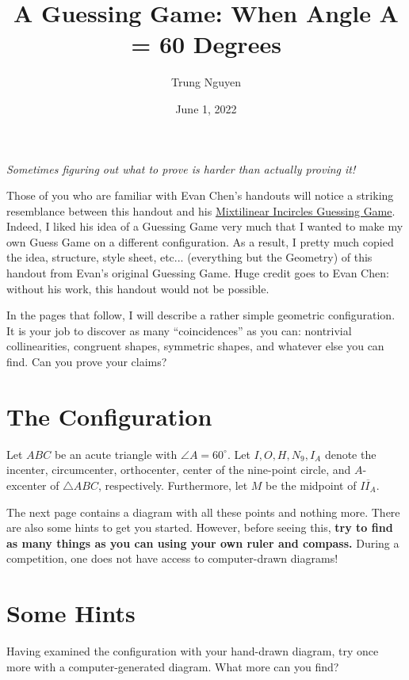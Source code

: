 \documentclass[11pt]{scrartcl}
\begin{document}
\title{A Guessing Game: When Angle A = 60 Degrees}
\author{Trung Nguyen}
\date{June 1, 2022}
\maketitle


\begin{center}
	\itshape
	Sometimes figuring out what to prove is harder than actually proving it!
\end{center}

Those of you who are familiar with Evan Chen's handouts will notice a striking resemblance between this handout and his \href{https://web.evanchen.cc/handouts/Mixt-GeoGuessr/Mixt-GeoGuessr.pdf}{Mixtilinear Incircles Guessing Game}. Indeed, I liked his idea of a Guessing Game very much that I wanted to make my own Guess Game on a different configuration. As a result, I pretty much copied the idea, structure, style sheet, etc...  (everything but the Geometry) of this handout from Evan's original Guessing Game. Huge credit goes to Evan Chen: without his work, this handout would not be possible.

In the pages that follow, I will describe a rather simple geometric configuration. It is your job to discover as many ``coincidences'' as you can: nontrivial collinearities, congruent shapes, symmetric shapes, and whatever else you can find. Can you prove your claims?

\tableofcontents

\section{The Configuration}
\begin{mdframed}
	Let $ABC$ be an acute triangle with $\angle A=60^\circ$. Let $I, O, H, N_9, I_A$ denote the 		incenter, circumcenter, orthocenter, center of the nine-point circle, and $A$-excenter of 			$\triangle ABC$, respectively. Furthermore, let $M$ be the midpoint of $\overline{II_A}$. 
\end{mdframed}

The next page contains a diagram with all these points and nothing more. There are also some hints to get you started.
However, before seeing this, \textbf{try to find as many things as you can
using your own ruler and compass.}
During a competition, one does not have access to computer-drawn diagrams!

\eject

\section{Some Hints}
Having examined the configuration with your hand-drawn diagram, try once more with a computer-generated diagram. What more can you find?
\end{document}
